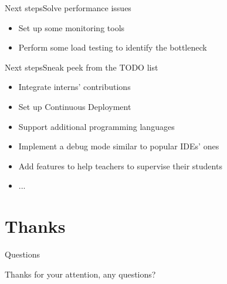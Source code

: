 \documentclass{beamer}
\begin{document}
\begin{frame}{Next steps}{Solve performance issues}
  \begin{itemize}
  \item {
    Set up some monitoring tools
  }
  \item {
    Perform some load testing to identify the bottleneck
  }
  \end{itemize}
\end{frame}

\begin{frame}{Next steps}{Sneak peek from the TODO list}
  \begin{itemize}
  \item Integrate interns' contributions
  \item Set up Continuous Deployment
  \item Support additional programming languages
  \item Implement a debug mode similar to popular IDEs' ones
  \item Add features to help teachers to supervise their students
  \item ...
  \end{itemize}
\end{frame}

\section*{Thanks}

\begin{frame}{Questions}
  \begin{center}
    Thanks for your attention, any questions?
  \end{center}
\end{frame}
\end{document}
